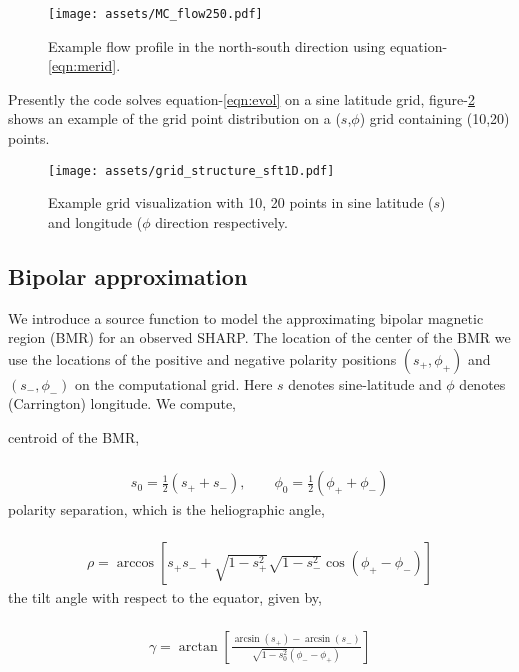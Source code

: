 \documentclass[twoside,12pt]{book}
\begin{document}
\begin{figure}
    \centering
    \texttt{[image: assets/MC\_flow250.pdf]}
    \caption{Example flow profile in the north-south direction using equation-\ref{eqn:merid}.}
    \label{fig:merid}
\end{figure}
Presently the code solves equation-\ref{eqn:evol} on a sine latitude grid, figure-\ref{fig:grid} shows an example of the grid point distribution on a ($s$,$\phi$) grid containing (10,20) points.
\begin{figure}[htbp]
    \centering
    \texttt{[image: assets/grid\_structure\_sft1D.pdf]}
    \caption{Example grid visualization with 10, 20 points in sine latitude ($s$) and longitude ($\phi$ direction respectively.}
    \label{fig:grid}
\end{figure}
\subsection{Bipolar approximation}
We introduce a source function to model the approximating bipolar magnetic region (BMR) for an observed SHARP. The location of the center of the BMR we use the locations of the positive and negative polarity positions $(s_+, \phi_+)$ and $(s_-,\phi_-)$ on the computational grid. Here $s$ denotes sine-latitude and $\phi$ denotes (Carrington) longitude. We compute,
\begin{itemize}
    \Item centroid of the BMR,\\ \\ \begin{align}
    s_0 = \frac12(s_+ + s_-),\qquad \phi_0 = \frac12(\phi_+ + \phi_-)
    \label{eqn:center}
    \end {align}
    \Item polarity separation, which is the heliographic angle,\\ \\ \begin{align}
    \rho = \arccos\left[s_+s_- + \sqrt{1-s_+^2}\sqrt{1 - s_-^2}\cos(\phi_+-\phi_-) \right]
    \label{eqn:separation}
    \end {align}
    \Item the tilt angle with respect to the equator, given by,\\ \\ \begin{align}
    \gamma = \arctan\left[\frac{\arcsin(s_+) - \arcsin(s_-)}{\sqrt{1-s_0^2}(\phi_- - \phi_+)}\right]
    \label{eqn:tilt}
    \end {align}
\end{itemize}
\end{document}
